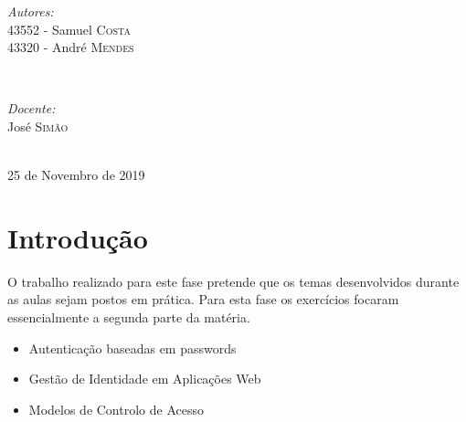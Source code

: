 \documentclass[11pt]{report}
\begin{document}
\begin{titlepage}
\vskip 70pt
\begin{minipage}{0.4\textwidth}
\begin{flushleft} \large
\emph{Autores:}\\
43552 - Samuel \textsc{Costa}\\
43320 - André \textsc{Mendes}
\end{flushleft}
\end{minipage}
~
\begin{minipage}{0.4\textwidth}
\begin{flushright} \large
\emph{Docente:} \\
José \textsc{Simão}\\
\end{flushright}
\end{minipage}\\[3cm]


{\large 25 de Novembro de 2019}\\[3cm] %


\vfill %

\end{titlepage}


\renewcommand\thesection{\arabic{section}}

\tableofcontents


\newpage


\section*{Introdução}
O trabalho realizado para este fase pretende que os temas desenvolvidos durante as aulas sejam postos em prática. Para esta fase os exercícios focaram essencialmente a segunda parte da matéria.\\

\begin{itemize}
  \item Autenticação baseadas em passwords
  \item Gestão de Identidade em Aplicações Web
  \item Modelos de Controlo de Acesso
\end{itemize}
\end{document}
